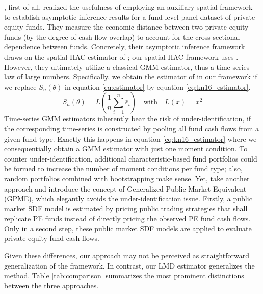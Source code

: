 \documentclass[12pt]{article}
\begin{document}
\cite{KN16}, first of all, realized the usefulness of employing an auxiliary spatial framework to establish asymptotic inference results for a fund-level panel dataset of private equity funds.
They measure the economic distance between two private equity funds (by the degree of cash flow overlap) to account for the cross-sectional dependence between funds.
Concretely, their asymptotic inference framework draws on the spatial HAC estimator of \cite{C99}; our spatial HAC framework uses \cite{PP97,KS11,JP12}.
However, they ultimately utilize a classical GMM estimator, thus a time-series law of large numbers.
Specifically, we obtain the estimator of \cite[equation 18]{KN16} in our framework if we replace $S_n(\theta)$ in equation \ref{eq:estimator} by equation \ref{eq:kn16_estimator}.
\begin{equation}
\label{eq:kn16_estimator}
	S_n(\theta) = 
	L \left( 
	\frac{1}{n}
	\sum_{i=1}^n
	\bar{\epsilon}_{i} 
	\right)
	\quad
	\mathrm{with}
	\quad
	L(x)=x^2
\end{equation}
Time-series GMM estimators inherently bear the risk of under-identification, if the corresponding time-series is constructed by pooling all fund cash flows from a given fund type.
Exactly this happens in equation \ref{eq:kn16_estimator} where we consequentially obtain a GMM estimator with just one moment condition.
To counter under-identification, additional characteristic-based fund portfolios could be formed to increase the number of moment conditions per fund type; also, random portfolios combined with bootstrapping make sense.
Yet, \cite{KN16} take another approach and introduce the concept of Generalized Public Market Equivalent (GPME), which elegantly avoids the under-identification issue.
Firstly, a public market SDF model is estimated by pricing public trading strategies that shall replicate PE funds instead of directly pricing the observed PE fund cash flows.
Only in a second step, these public market SDF models are applied to evaluate private equity fund cash flows.

Given these differences, our approach may not be perceived as straightforward generalization of the \cite{KN16} framework.
In contrast, our LMD estimator generalizes the \cite{DLP12} method. 
Table \ref{tab:comparison} summarizes the most prominent distinctions between the three approaches.
\end{document}

